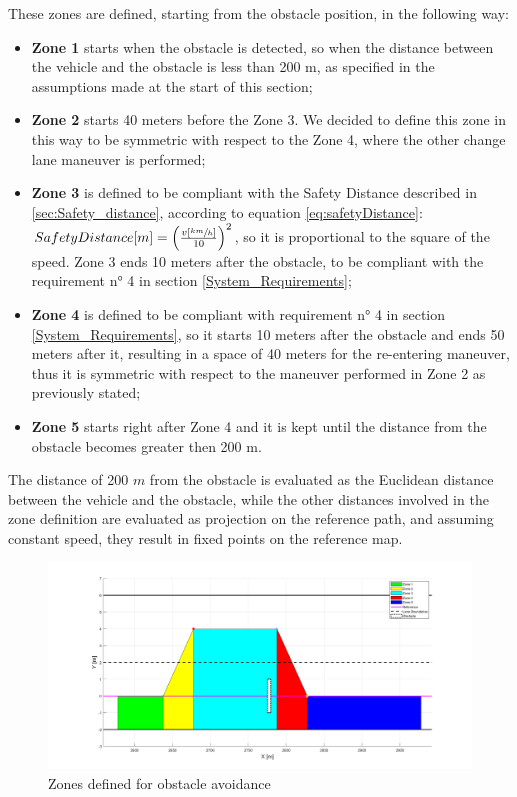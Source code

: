 These zones are defined, starting from the obstacle position, in the following way:
\begin{itemize}
    \item \textbf{Zone 1} starts when the obstacle is detected, so when the distance between the vehicle and the obstacle is less than 200 m, as specified in the assumptions made at the start of this section;
    \item \textbf{Zone 2} starts 40 meters before the Zone 3. We decided to define this zone in this way to be symmetric with respect to the Zone 4, where the other change lane maneuver is performed;
    \item \textbf{Zone 3} is defined to be compliant with the Safety Distance described in \ref{sec:Safety_distance}, according to equation \ref{eq:safetyDistance}: $SafetyDistance [m] = \left(\frac{v[\sfrac{km}{h}]}{10}\right)^2$, so it is proportional to the square of the speed. Zone 3 ends 10 meters after the obstacle, to be compliant with the requirement n° 4 in section \ref{System_Requirements};
    \item \textbf{Zone 4} is defined to be compliant with requirement n° 4 in section \ref{System_Requirements}, so it starts 10 meters after the obstacle and ends 50 meters after it, resulting in a space of 40 meters for the re-entering maneuver, thus it is symmetric with respect to the maneuver performed in Zone 2 as previously stated;
    \item \textbf{Zone 5} starts right after Zone 4 and it is kept until the distance from the obstacle becomes greater then 200 m.
\end{itemize}
The distance of 200 $m$ from the obstacle is evaluated as the Euclidean distance between the vehicle and the obstacle, while the other distances involved in the zone definition are evaluated as projection on the reference path, and assuming constant speed, they result in fixed points on the reference map.
\begin{figure}[H]
    \centering
    \includegraphics[width=1\textwidth]{Figures/Zones.png}
    \caption{Zones defined for obstacle avoidance}
      \label{fig:Zones}
\end{figure}
